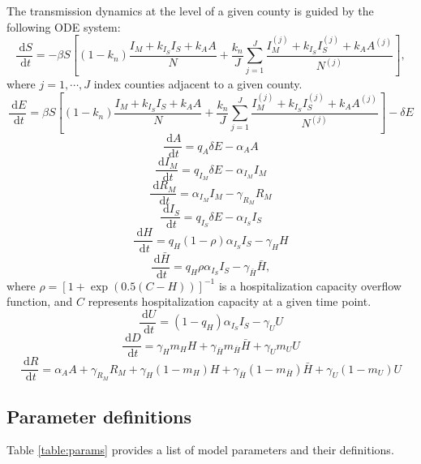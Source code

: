 \documentclass[11pt]{article}
\newcommand{\dx}[1]{\ \text{d} #1}
\begin{document}
The transmission dynamics at the level of a given county is guided by the following ODE system: \\
\[ \frac{\dx{S}}{\dx{t}} = -\beta S \left[ (1-k_n) \frac{ I_M + k_{I_S} I_S + k_A A}{N} + \frac{k_n}{J} \sum_{j=1}^J  \frac{I_M^{(j)} + k_{I_S} I_S^{(j)} + k_A A^{(j)}}{N^{(j)}} \right], \]
where $j = 1, \cdots , J$ index counties adjacent to a given county.
\[ \frac{\dx{E}}{\dx{t}} = \beta S \left[ (1-k_n) \frac{ I_M + k_{I_S} I_S + k_A A}{N} + \frac{k_n}{J} \sum_{j=1}^J  \frac{I_M^{(j)} + k_{I_S} I_S^{(j)} + k_A A^{(j)}}{N^{(j)}} \right] - \delta E \]
\[ \frac{\dx{A}}{\dx{t}} = q_A \delta E - \alpha_A A \]
\[ \frac{\dx{I_M}}{\dx{t}} = q_{I_M} \delta E - \alpha_{I_M} I_M \]
\[ \frac{\dx{R_M}}{\dx{t}} = \alpha_{I_M} I_M - \gamma_{R_M} R_M \]
\[ \frac{\dx{I_S}}{\dx{t}} = q_{I_S} \delta E - \alpha_{I_S} I_S \]
\[ \frac{\dx{H}}{\dx{t}} =  q_H (1 - \rho) \alpha_{I_S} I_S - \gamma_H H  \]
\[ \frac{\dx{\bar{H}}}{\dx{t}} =  q_H \rho \alpha_{I_S} I_S - \gamma_{\bar{H}} \bar{H},  \]
where $\rho = \left[ 1+\exp(0.5(C-H)) \right]^{-1}$ is a hospitalization capacity overflow function, and $C$ represents hospitalization capacity at a given time point.
\[ \frac{\dx{U}}{\dx{t}} =  (1 - q_H) \alpha_{I_S} I_S - \gamma_{U} U  \]
\[ \frac{\dx{D}}{\dx{t}} = \gamma_H m_H H + \gamma_{\bar{H}}  m_{\bar{H}} \bar{H} + \gamma_{U} m_{U} U \]
\[ \frac{\dx{R}}{\dx{t}} = \alpha_A A + \gamma_{R_M} R_M + \gamma_H (1-m_H) H + \gamma_{\bar{H}} (1 - m_{\bar{H}}) \bar{H} + \gamma_{U} (1- m_{U}) U  \]




\subsection{Parameter definitions}

Table \ref{table:params} provides a list of model parameters and their definitions. 
\end{document}
